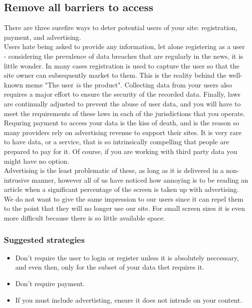 \subsection{Remove all barriers to access}

There are three surefire ways to deter potential users of your site: registration, payment, and advertising.\\

Users hate being asked to provide any information, let alone registering as a user - considering the prevalence of data breaches that are regularly in the news, it is little wonder.
In many cases registration is used to capture the user so that the site owner can subsequently market to them.
This is the reality behind the well-known meme "The user \emph{is} the product".
Collecting data from your users also requires a major effort to ensure the security of the recorded data.
Finally, laws are continually adjusted to prevent the abuse of user data, and you will have to meet the requirements of these laws in each of the jurisdictions that you operate. \\

Requring payment to access your data is the kiss of death, and is the reason so many providers rely on advertising 
revenue to support their sites. It is very rare to have data, or a service, that is so intrinsically compelling that
people are prepared to pay for it.
Of course, if you are working with third party data you might have no option. \\

Advertising is the least problematic of these, as long as it is delivered in a non-intrusive manner, however
all of us have noticed how annoying is to be reading an article when a significant percentage of the screen is taken up with advertising.
We do not want to give the same impression to our users since it can repel them to the point that they will no longer
use our site. For small screen sizes it is even more difficult because there is so little available space.\\

\subsubsection*{Suggested strategies} 

\begin{itemize}
    \item Don't require the user to login or register unless it is absolutely neccessary, and even then, only for the subset
    of your data thet requires it.
    \item Don't require payment.
    \item If you must include advertisting, ensure it does not intrude on your content.
\end{itemize}

